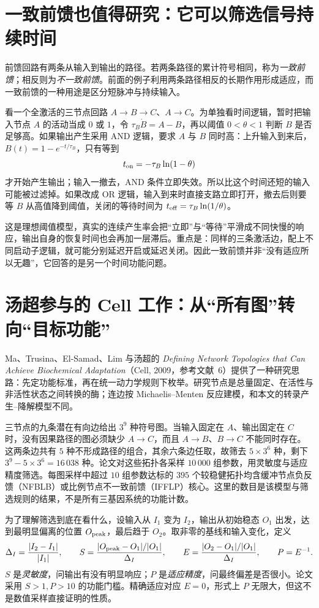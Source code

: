 \section{一致前馈也值得研究：它可以筛选信号持续时间}
前馈回路有两条从输入到输出的路径。若两条路径的累计符号相同，称为\emph{一致前馈}；相反则为\emph{不一致前馈}。前面的例子利用两条路径相反的长期作用形成适应，而一致前馈的一种用途是区分短脉冲与持续输入。

看一个全激活的三节点回路 $A\to B\to C$、$A\to C$。为单独看时间逻辑，暂时把输入节点 $A$ 的活动当成 $0$ 或 $1$，令 $\tau_B\dot B=A-B$，再以阈值 $0<\theta<1$ 判断 $B$ 是否足够高。如果输出产生采用 AND 逻辑，要求 $A$ 与 $B$ 同时高：上升输入到来后，$B(t)=1-e^{-t/\tau_B}$，只有等到
\[
t_{\rm on}=-\tau_B\ln(1-\theta)
\]
才开始产生输出；输入一撤去，AND 条件立即失效。所以比这个时间还短的输入可能被过滤掉。如果改成 OR 逻辑，输入到来时直接支路立即打开，撤去后则要等 $B$ 从高值降到阈值，关闭的等待时间为 $t_{\rm off}=\tau_B\ln(1/\theta)$。

这是理想阈值模型，真实的连续产生率会把“立即”与“等待”平滑成不同快慢的响应，输出自身的恢复时间也会再加一层滞后。重点是：同样的三条激活边，配上不同启动子逻辑，就可能分别延迟开启或延迟关闭。因此一致前馈并非“没有适应所以无趣”，它回答的是另一个时间功能问题。

\section{汤超参与的 Cell 工作：从“所有图”转向“目标功能”}
Ma、Trusina、El-Samad、Lim 与汤超的 \emph{Defining Network Topologies that Can Achieve Biochemical Adaptation}（Cell, 2009，参考文献~6）提供了一种研究思路：先定功能标准，再在统一动力学规则下枚举。研究节点是总量固定、在活性与非活性状态之间转换的酶；连边按 Michaelis--Menten 反应建模，和本文的转录产生--降解模型不同。

三节点的九条潜在有向边给出 $3^9$ 种符号图。当输入固定在 $A$、输出固定在 $C$ 时，没有因果路径的图必须缺少 $A\to C$，而且 $A\to B$、$B\to C$ 不能同时存在。这两条边共有 $5$ 种不形成路径的组合，其余六条边任取，故筛去 $5\times3^6$ 种，剩下 $3^9-5\times3^6=16\,038$ 种。论文对这些拓扑各采样 $10\,000$ 组参数，用灵敏度与适应精度筛选。每图采样中超过 $10$ 组参数达标的 $395$ 个较稳健拓扑均含缓冲节点负反馈（NFBLB）或比例节点不一致前馈（IFFLP）核心。这里的数目是该模型与筛选规则的结果，不是所有三基因系统的功能计数。

为了理解筛选到底在看什么，设输入从 $I_1$ 变为 $I_2$，输出从初始稳态 $O_1$ 出发，达到最明显偏离的位置 $O_{\rm peak}$，最后趋于 $O_2$。取非零的基线和输入变化，定义
\[
\Delta_I=\frac{|I_2-I_1|}{|I_1|},\qquad
S=\frac{|O_{\rm peak}-O_1|/|O_1|}{\Delta_I},\qquad
E=\frac{|O_2-O_1|/|O_1|}{\Delta_I},\qquad P=E^{-1}.
\]
$S$ 是\emph{灵敏度}，问输出有没有明显响应；$P$ 是\emph{适应精度}，问最终偏差是否很小。论文采用 $S>1,P>10$ 的功能门槛。精确适应对应 $E=0$，形式上 $P$ 无限大，但这不是数值采样直接证明的性质。

